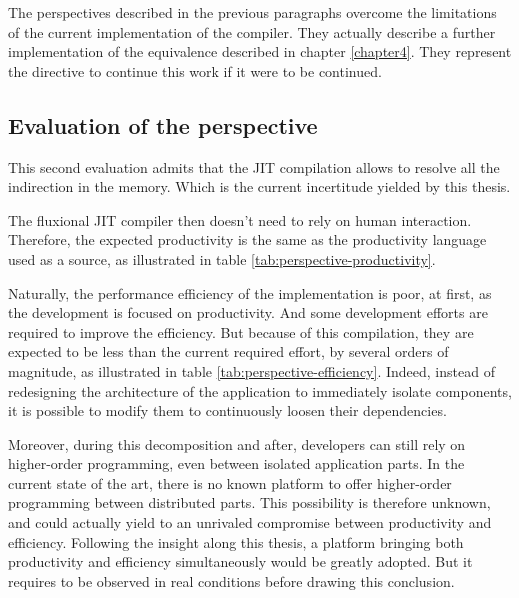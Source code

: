 
\separator

The perspectives described in the previous paragraphs overcome the limitations of the current implementation of the compiler.
They actually describe a further implementation of the equivalence described in chapter \ref{chapter4}.
They represent the directive to continue this work if it were to be continued.

\subsection{Evaluation of the perspective}

This second evaluation admits that the JIT compilation allows to resolve all the indirection in the memory.
Which is the current incertitude yielded by this thesis.

The fluxional JIT compiler then doesn't need to rely on human interaction.
Therefore, the expected productivity is the same as the productivity language used as a source, as illustrated in table \ref{tab:perspective-productivity}.


Naturally, the performance efficiency of the implementation is poor, at first, as the development is focused on productivity.
And some development efforts are required to improve the efficiency.
But because of this compilation, they are expected to be less than the current required effort, by several orders of magnitude, as illustrated in table \ref{tab:perspective-efficiency}.
Indeed, instead of redesigning the architecture of the application to immediately isolate components, it is possible to modify them to continuously loosen their dependencies.


Moreover, during this decomposition and after, developers can still rely on higher-order programming, even between isolated application parts.
In the current state of the art, there is no known platform to offer higher-order programming between distributed parts.
This possibility is therefore unknown, and could actually yield to an unrivaled compromise between productivity and efficiency.
Following the insight along this thesis, a platform bringing both productivity and efficiency simultaneously would be greatly adopted.
But it requires to be observed in real conditions before drawing this conclusion.


\separator


